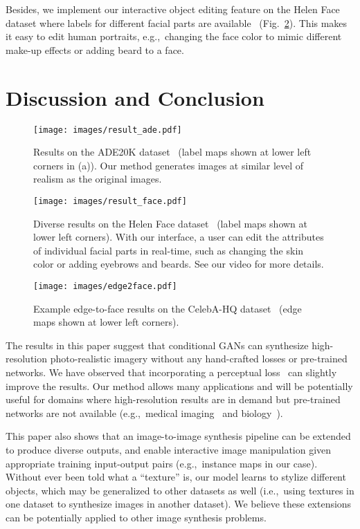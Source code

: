 \documentclass[10pt,twocolumn,letterpaper]{article}
\newcommand{\reffig}[1]{Fig.~\ref{fig:#1}}
\newcommand{\lblfig}[1]{\label{fig:#1}}
\newcommand{\lblsec}[1]{\label{sec:#1}}
\begin{document}
Besides, we implement our interactive object editing feature on the Helen Face dataset where labels for different facial parts are available~\cite{smith2013exemplar} (\reffig{qual_face}).
This makes it easy to edit human portraits, e.g.,\ changing the face color to mimic different make-up effects or adding beard to a face.
 
\section{Discussion and Conclusion} \lblsec{conclusion}

\begin{figure}
  \centering
  \texttt{[image: images/result\_ade.pdf]}  
  \caption{Results on the ADE20K dataset~\cite{zhou2017scene} (label maps shown at lower left corners in (a)). Our method generates images at similar level of realism as the original images.}
  \lblfig{qual_ade}
\end{figure}

\begin{figure}
  \centering
  \texttt{[image: images/result\_face.pdf]}  
  \caption{Diverse results on the Helen Face dataset~\cite{smith2013exemplar} (label maps shown at lower left corners). With our interface, a user can edit the attributes of individual facial parts in real-time, such as changing the skin color or adding eyebrows and beards. See our video for more details.
  }
  \lblfig{qual_face}
\end{figure}

\begin{figure}
  \centering
  \texttt{[image: images/edge2face.pdf]}  
  \caption{Example edge-to-face results on the CelebA-HQ dataset~\cite{karras2017progressive} (edge maps shown at lower left corners).
  }
  \lblfig{edge2face}
\end{figure}

The results in this paper suggest that conditional GANs can synthesize high-resolution photo-realistic imagery without any hand-crafted losses or pre-trained networks. We have observed that incorporating a perceptual loss~\cite{johnson2016perceptual} can slightly improve the results. Our method allows many applications and will be potentially useful for domains where high-resolution results are in demand but pre-trained networks are not available (e.g.,\ medical imaging~\cite{guibas2017synthetic} and biology~\cite{costa2017end}).

This paper also shows that an image-to-image synthesis pipeline can be extended to produce diverse outputs, and enable interactive image manipulation given appropriate training input-output pairs (e.g.,\ instance maps in our case). Without ever been told what a ``texture'' is, our model learns to stylize different objects, which may be generalized to other datasets as well (i.e.,\ using textures in one dataset to synthesize images in another dataset).
We believe these extensions  can be potentially applied to other image synthesis problems. 
\end{document}
